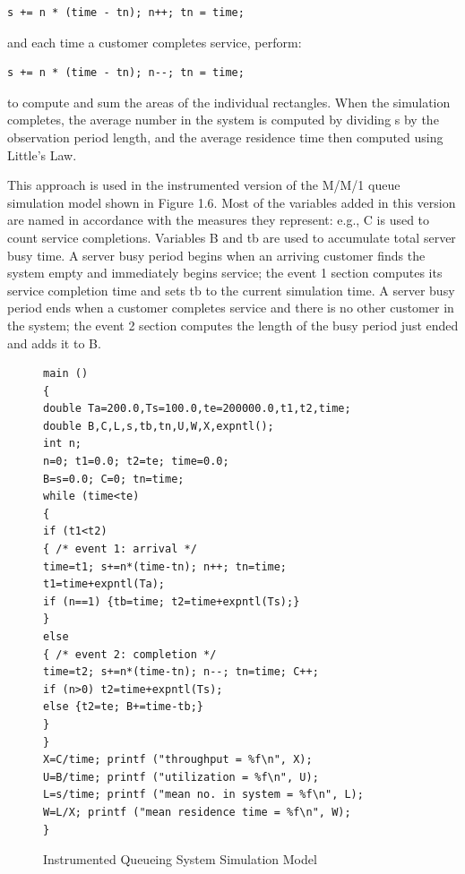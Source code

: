 \begin{verbatim}
s += n * (time - tn); n++; tn = time;
\end{verbatim}

and each time a customer completes service, perform:

\begin{verbatim}
s += n * (time - tn); n--; tn = time;
\end{verbatim}

to compute and sum the areas of the individual rectangles. When the simulation
completes, the average number in the system is computed by dividing s by the
observation period length, and the average residence time then computed using
Little's Law.

This approach is used in the instrumented version of the M/M/1 queue simulation
model shown in Figure 1.6. Most of the variables added in this version are
named in accordance with the measures they represent: e.g., C is used to count
service completions. Variables B and tb are used to accumulate total server
busy time. A server busy period begins when an arriving customer finds the
system empty and immediately begins service; the event 1 section computes its
service completion time and sets tb to the current simulation time. A server
busy period ends when a customer completes service and there is no other
customer in the system; the event 2 section computes the length of the busy
period just ended and adds it to B.

\begin{figure}[htbp]
  \centering
  \begin{minipage}{0.9\textwidth}
    \begin{verbatim}
main ()
{
double Ta=200.0,Ts=100.0,te=200000.0,t1,t2,time;
double B,C,L,s,tb,tn,U,W,X,expntl();
int n;
n=0; t1=0.0; t2=te; time=0.0;
B=s=0.0; C=0; tn=time;
while (time<te)
{
if (t1<t2)
{ /* event 1: arrival */
time=t1; s+=n*(time-tn); n++; tn=time;
t1=time+expntl(Ta);
if (n==1) {tb=time; t2=time+expntl(Ts);}
}
else
{ /* event 2: completion */
time=t2; s+=n*(time-tn); n--; tn=time; C++;
if (n>0) t2=time+expntl(Ts);
else {t2=te; B+=time-tb;}
}
}
X=C/time; printf ("throughput = %f\n", X);
U=B/time; printf ("utilization = %f\n", U);
L=s/time; printf ("mean no. in system = %f\n", L);
W=L/X; printf ("mean residence time = %f\n", W);
}
    \end{verbatim}
  \end{minipage}
  \caption{Instrumented Queueing System Simulation Model}
\end{figure}

